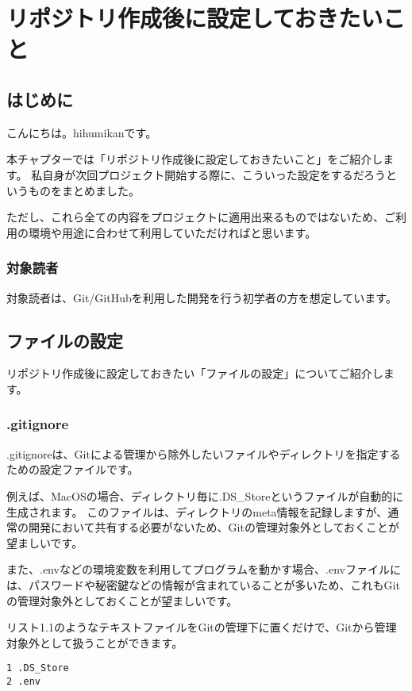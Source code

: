 \chapter{リポジトリ作成後に設定しておきたいこと}
\section{はじめに}
こんにちは。hihumikanです。

本チャプターでは「リポジトリ作成後に設定しておきたいこと」をご紹介します。
私自身が次回プロジェクト開始する際に、こういった設定をするだろうというものをまとめました。

ただし、これら全ての内容をプロジェクトに適用出来るものではないため、ご利用の環境や用途に合わせて利用していただければと思います。

\subsection{対象読者}

対象読者は、Git/GitHubを利用した開発を行う初学者の方を想定しています。

\section{ファイルの設定}

リポジトリ作成後に設定しておきたい「ファイルの設定」についてご紹介します。

\subsection{.gitignore}

.gitignoreは、Gitによる管理から除外したいファイルやディレクトリを指定するための設定ファイルです。

例えば、MacOSの場合、ディレクトリ毎に.DS\_Storeというファイルが自動的に生成されます。
このファイルは、ディレクトリのmeta情報を記録しますが、通常の開発において共有する必要がないため、Gitの管理対象外としておくことが望ましいです。

また、.envなどの環境変数を利用してプログラムを動かす場合、.envファイルには、パスワードや秘密鍵などの情報が含まれていることが多いため、これもGitの管理対象外としておくことが望ましいです。

リスト1.1のようなテキストファイルをGitの管理下に置くだけで、Gitから管理対象外として扱うことができます。

\begin{tcolorbox}[title=リスト1.1 .gitignore]
  \begin{verbatim}
1 .DS_Store
2 .env
\end{verbatim}
\end{tcolorbox}

